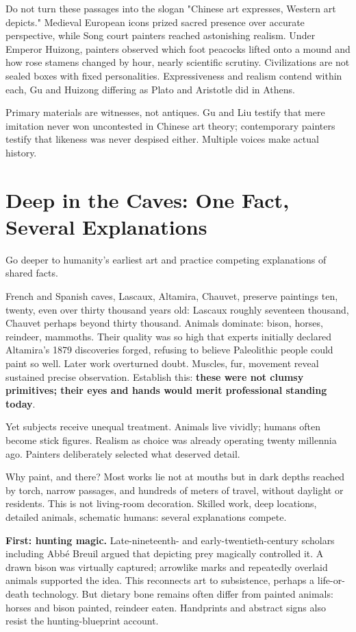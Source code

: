 Do not turn these passages into the slogan "Chinese art expresses, Western art depicts." Medieval European icons prized sacred presence over accurate perspective, while Song court painters reached astonishing realism. Under Emperor Huizong, painters observed which foot peacocks lifted onto a mound and how rose stamens changed by hour, nearly scientific scrutiny. Civilizations are not sealed boxes with fixed personalities. Expressiveness and realism contend within each, Gu and Huizong differing as Plato and Aristotle did in Athens.

Primary materials are witnesses, not antiques. Gu and Liu testify that mere imitation never won uncontested in Chinese art theory; contemporary painters testify that likeness was never despised either. Multiple voices make actual history.

\section[Cave Art: Several Explanations]{Deep in the Caves: One Fact, Several Explanations}
Go deeper to humanity's earliest art and practice competing explanations of shared facts.

French and Spanish caves, Lascaux, Altamira, Chauvet, preserve paintings ten, twenty, even over thirty thousand years old: Lascaux roughly seventeen thousand, Chauvet perhaps beyond thirty thousand. Animals dominate: bison, horses, reindeer, mammoths. Their quality was so high that experts initially declared Altamira's 1879 discoveries forged, refusing to believe Paleolithic people could paint so well. Later work overturned doubt. Muscles, fur, movement reveal sustained precise observation. Establish this: \textbf{these were not clumsy primitives; their eyes and hands would merit professional standing today}.

Yet subjects receive unequal treatment. Animals live vividly; humans often become stick figures. Realism as choice was already operating twenty millennia ago. Painters deliberately selected what deserved detail.

Why paint, and there? Most works lie not at mouths but in dark depths reached by torch, narrow passages, and hundreds of meters of travel, without daylight or residents. This is not living-room decoration. Skilled work, deep locations, detailed animals, schematic humans: several explanations compete.

\textbf{First: hunting magic.} Late-nineteenth- and early-twentieth-century scholars including Abbé Breuil argued that depicting prey magically controlled it. A drawn bison was virtually captured; arrowlike marks and repeatedly overlaid animals supported the idea. This reconnects art to subsistence, perhaps a life-or-death technology. But dietary bone remains often differ from painted animals: horses and bison painted, reindeer eaten. Handprints and abstract signs also resist the hunting-blueprint account.

